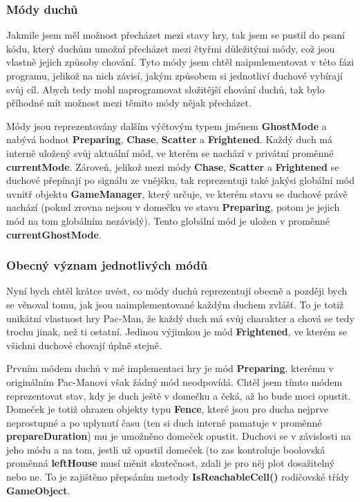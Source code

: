 \documentclass[a4]{article}
\begin{document}
\subsubsection{Módy duchů} \label{generalmodes}
Jakmile jsem měl možnost přecházet mezi stavy hry, tak jsem se pustil do psaní kódu, který duchům umožní přecházet mezi čtyřmi důležitými módy, což jsou vlastně jejich způsoby chování. Tyto módy jsem chtěl naipmlementovat v této fázi programu, jelikož na nich závisí, jakým způsobem si jednotliví duchové vybírají svůj cíl. Abych tedy mohl naprogramovat složitější chování duchů, tak bylo příhodné mít možnost mezi těmito módy nějak přecházet.

Módy jsou reprezentovány dalším výčtovým typem jménem \textbf{GhostMode} a nabývá hodnot \textbf{Preparing}, \textbf{Chase}, \textbf{Scatter} a \textbf{Frightened}. Každý duch má interně uložený svůj aktuální mód, ve kterém se nachází v privátní proměnné \textbf{currentMode}. Zároveň, jelikož mezi módy \textbf{Chase}, \textbf{Scatter} a \textbf{Frightened} se duchové přepínají po signálu ze vnějšku, tak reprezentuji také jakýsi globální mód uvnitř objektu \textbf{GameManager}, který určuje, ve kterém stavu se duchové právě nachází (pokud zrovna nejsou v domečku ve stavu \textbf{Preparing}, potom je jejich mód na tom globálním nezávislý). Tento globální mód je uložen v proměnné \textbf{currentGhostMode}.

\subsubsection{Obecný význam jednotlivých módů} \label{modemeaning}
Nyní bych chtěl krátce uvést, co módy duchů reprezentují obecně a později bych se věnoval tomu, jak jsou naimplementované každým duchem zvlášť. To je totiž unikátní vlastnost hry Pac-Man, že každý duch má svůj charakter a chová se tedy trochu jinak, než ti ostatní. Jedinou výjimkou je mód \textbf{Frightened}, ve kterém se všichni duchové chovají úplně stejně.

Prvním módem duchů v mé implementaci hry je mód \textbf{Preparing}, kterému v originálním Pac-Manovi však žádný mód neodpovídá. Chtěl jsem tímto módem reprezentovat stav, kdy je duch ještě v domečku a čeká, až ho bude moci opustit. Domeček je totiž ohrazen objekty typu \textbf{Fence}, které jsou pro ducha nejprve neprostupné a po uplynutí času (ten si duch interně pamatuje v proměnné \textbf{prepareDuration}) mu je umožněno domeček opustit. Duchovi se v závislosti na jeho módu a na tom, jestli už opustil domeček (to zas kontroluje boolovská proměnná \textbf{leftHouse} musí měnit skutečnost, zdali je pro něj plot dosažitelný nebo ne. To je zajištěno přepsáním metody \textbf{IsReachableCell()} rodičovské třídy \textbf{GameObject}.
\end{document}
